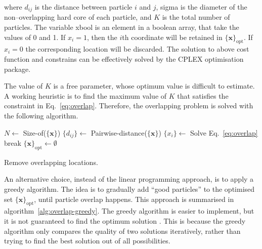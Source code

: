 \documentclass[11pt,twoside]{report}
\begin{document}
\noindent where $d_{ij}$ is the distance between particle $i$ and $j$, \gls{sigma} is the diameter of the non--overlapping hard core of each particle, and $K$ is the total number of particles. The variable \gls{xbool} is an element in a boolean array, that take the values of 0 and 1. If $x_i = 1$, then the $i$th coordinate will be retained in $\{ \mathbf{x} \}_\mathrm{opt}$. If $x_i = 0$ the corresponding location will be discarded. The solution to above cost function and constrains can be effectively solved by the CPLEX optimisation package.


The value of $K$ is a free parameter, whose optimum value is difficult to estimate. A working heuristic is to find the maximum value of $K$ that satisfies the constraint in Eq.~\ref{eq:overlap}. Therefore, the overlapping problem is solved with the following algorithm.

\begin{algorithm}
$N \gets$ Size-of($\{ \mathbf{x} \}$)\;
$\{d_{ij} \} \gets$ Pairwise-distance($\{ \mathbf{x} \}$)\;
 {
	$\{x_i\} \gets$ Solve Eq.~\ref{eq:overlap}\;
	 {
		break\;
	}
}
$\{ \mathbf{x} \}_\textrm{opt} \gets \emptyset$\;
\caption{Remove overlapping locations.}
\label{alg:overlap}
\end{algorithm}


An alternative choice, instead of the linear programming approach, is to apply a greedy algorithm. The idea is to gradually add ``good particles'' to the optimised set $\{\mathbf{x}\}_\textrm{opt}$, until particle overlap happens. This approach is summarised in algorithm~\ref{alg:overlap-greedy}.
The greedy algorithm is easier to implement, but it is not guaranteed to find the optimum solution \cite{klein2013coding}. This is because the greedy algorithm only compares the quality of two solutions iteratively, rather than trying to find the best solution out of all possibilities.
\end{document}
